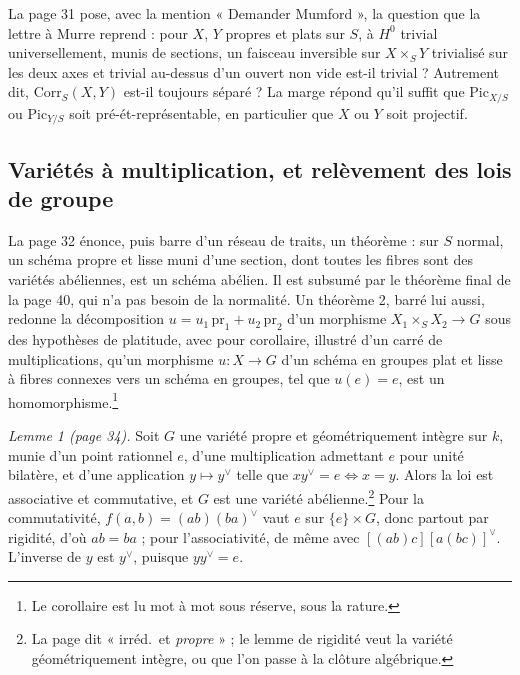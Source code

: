 \documentclass[11pt,a4paper]{article}
\begin{document}
La page 31 pose, avec la mention « Demander Mumford », la question que la
lettre à Murre reprend : pour $X$, $Y$ propres et plats sur $S$, à $H^0$
trivial universellement, munis de sections, un faisceau inversible sur
$X \times_S Y$ trivialisé sur les deux axes et trivial au-dessus d'un ouvert
non vide est-il trivial ? Autrement dit, $\mathrm{Corr}_S(X, Y)$ est-il
toujours séparé ? La marge répond qu'il suffit que $\mathrm{Pic}_{X/S}$ ou
$\mathrm{Pic}_{Y/S}$ soit pré-ét-représentable, en particulier que $X$ ou $Y$
soit projectif.

\subsection*{Variétés à multiplication, et relèvement des lois de groupe}

La page 32 énonce, puis barre d'un réseau de traits, un théorème : sur $S$
normal, un schéma propre et lisse muni d'une section, dont toutes les fibres
sont des variétés abéliennes, est un schéma abélien. Il est subsumé par le
théorème final de la page 40, qui n'a pas besoin de la normalité. Un
théorème 2, barré lui aussi, redonne la décomposition
$u = u_1\,\mathrm{pr}_1 + u_2\,\mathrm{pr}_2$ d'un morphisme
$X_1 \times_S X_2 \to G$ sous des hypothèses de platitude, avec pour corollaire,
illustré d'un carré de multiplications, qu'un morphisme $u \colon X \to G$ d'un
schéma en groupes plat et lisse à fibres connexes vers un schéma en groupes,
tel que $u(e) = e$, est un homomorphisme.\footnote{Le corollaire est lu mot à
mot sous réserve, sous la rature.}

\emph{Lemme 1 (page 34).} Soit $G$ une variété propre et géométriquement
intègre sur $k$, munie d'un point rationnel $e$, d'une multiplication
admettant $e$ pour unité bilatère, et d'une application $y \mapsto y^\vee$
telle que $x y^\vee = e \iff x = y$. Alors la loi est associative et
commutative, et $G$ est une variété abélienne.\footnote{La page dit
« irréd.\ et \emph{propre} » ; le lemme de rigidité veut la variété
géométriquement intègre, ou que l'on passe à la clôture algébrique.} Pour la
commutativité, $f(a, b) = (ab)(ba)^\vee$ vaut $e$ sur $\{e\} \times G$, donc
partout par rigidité, d'où $ab = ba$ ; pour l'associativité, de même avec
$[(ab)c][a(bc)]^\vee$. L'inverse de $y$ est $y^\vee$, puisque $y y^\vee = e$.
\end{document}
